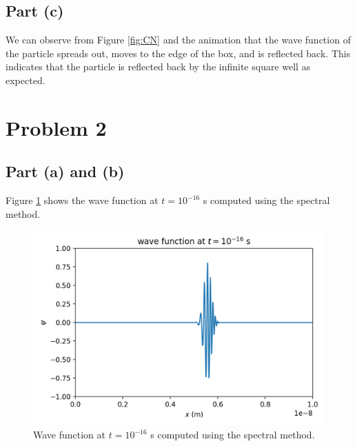 \documentclass[11pt]{article}
\begin{document}
\subsection{Part (c)}\label{explain}
We can observe from Figure \ref{fig:CN} and the animation that the wave function of the particle spreads out, moves to the edge of the box, and is reflected back. This indicates that the particle is reflected back by the infinite square well as expected.

\section{Problem 2}

\subsection{Part (a) and (b)}
Figure \ref{fig:test} shows the wave function at $t = 10^{-16}$ s computed using the spectral method.
\begin{figure}[H]
    \centering
    \includegraphics[scale = 0.7]{Figs/ps-10-2-test.png}
    \caption{Wave function at $t = 10^{-16}$ s computed using the spectral method.}
    \label{fig:test}
\end{figure}
\end{document}

